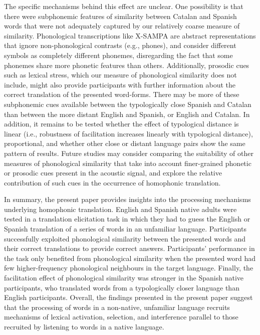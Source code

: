 \documentclass[
  man,
  longtable,
  nolmodern,
  notxfonts,
  notimes,
  colorlinks=true,linkcolor=blue,citecolor=blue,urlcolor=blue]{apa7}
\begin{document}
The specific mechanisms behind this effect are unclear. One possibility
is that there were subphonemic features of similarity between Catalan
and Spanish words that were not adequately captured by our relatively
coarse measure of similarity. Phonological transcriptions like X-SAMPA
are abstract representations that ignore non-phonological contrasts
(e.g., phones), and consider different symbols as completely different
phonemes, disregarding the fact that some phonemes share more phonetic
features than others. Additionally, prosodic cues such as lexical
stress, which our measure of phonological similarity does not include,
might also provide participants with further information about the
correct translation of the presented word-forms. There may be more of
these subphonemic cues available between the typologically close Spanish
and Catalan than between the more distant English and Spanish, or
English and Catalan. In addition, it remains to be tested whether the
effect of typological distance is linear (i.e., robustness of
facilitation increases linearly with typological distance),
proportional, and whether other close or distant language pairs show the
same pattern of results. Future studies may consider comparing the
suitability of other measures of phonological similarity that take into
account finer-grained phonetic or prosodic cues present in the acoustic
signal, and explore the relative contribution of such cues in the
occurrence of homophonic translation.

In summary, the present paper provides insights into the processing
mechanisms underlying homophonic translation. English and Spanish native
adults were tested in a translation elicitation task in which they had
to guess the English or Spanish translation of a series of words in an
unfamiliar language. Participants successfully exploited phonological
similarity between the presented words and their correct translations to
provide correct answers. Participants' performance in the task only
benefited from phonological similarity when the presented word had few
higher-frequency phonological neighbours in the target language.
Finally, the facilitation effect of phonological similarity was stronger
in the Spanish native participants, who translated words from a
typologically closer language than English participants. Overall, the
findings presented in the present paper suggest that the processing of
words in a non-native, unfamiliar language recruits mechanisms of
lexical activation, selection, and interference parallel to those
recruited by listening to words in a native language.
\end{document}
